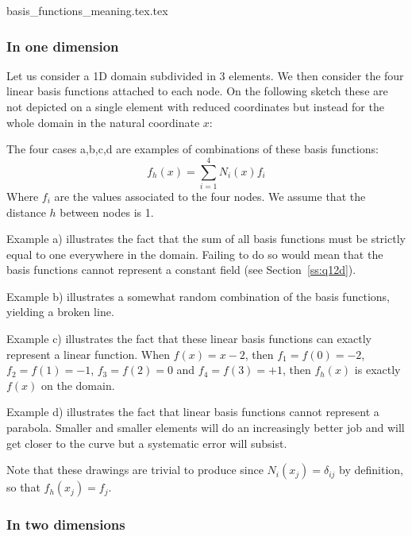 \begin{flushright} {\tiny {\color{gray} basis\_functions\_meaning.tex.tex}} \end{flushright}


\subsubsection{In one dimension}

Let us consider a 1D domain subdivided in 3 elements. We then consider the four linear basis functions 
attached to each node. On the following sketch these are not depicted on a single element with 
reduced coordinates but instead for the whole domain in the natural coordinate $x$:



The four cases a,b,c,d are examples of combinations of these basis functions:
\[
f_h(x)=\sum_{i=1}^4 N_i(x) f_i
\]
Where $f_i$ are the values associated to the four nodes. 
We assume that the distance $h$ between nodes is 1.

Example a) illustrates the fact that the sum of all basis functions must be strictly equal to one everywhere
in the domain. Failing to do so would mean that the basis functions cannot represent a constant field (see
Section~\ref{ss:q12d}). 

Example b) illustrates a somewhat random combination of the basis functions, yielding a broken line. 

Example c) illustrates the fact that these linear basis functions can exactly represent a
linear function. When $f(x)=x-2$, then $f_1=f(0)=-2$, $f_2=f(1)=-1$, $f_3=f(2)=0$ and $f_4=f(3)=+1$, 
then $f_h(x)$ is exactly $f(x)$ on the domain.

Example d) illustrates the fact that linear basis functions cannot represent a parabola. Smaller and 
smaller elements will do an increasingly better job and will get closer to the curve but a 
systematic error will subsist.  


Note that these drawings are trivial to produce since $N_i(x_j)=\delta_{ij}$ by definition, so that 
$f_h(x_j)=f_j$.

\subsubsection{In two dimensions}



